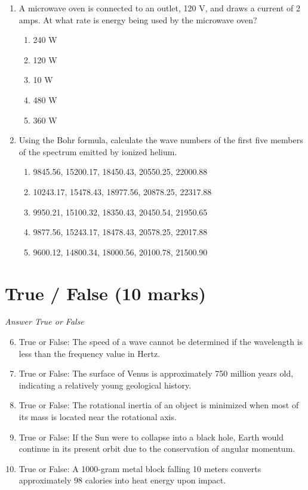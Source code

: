 \documentclass[12pt]{article}
\begin{document}
\begin{enumerate}[label=\arabic*.]
\item A microwave oven is connected to an outlet, 120 V, and draws a current of 2 amps. At what
rate is energy being used by the microwave oven?
\begin{enumerate}[label=(\alph*)]
    \item 240 W
    \item 120 W
    \item 10 W
    \item 480 W
    \item 360 W
\end{enumerate}
\item Using the Bohr formula, calculate the wave numbers of the first five members of the
spectrum emitted by ionized helium.
\begin{enumerate}[label=(\alph*)]
    \item 9845.56, 15200.17, 18450.43, 20550.25, 22000.88
    \item 10243.17, 15478.43, 18977.56, 20878.25, 22317.88
    \item 9950.21, 15100.32, 18350.43, 20450.54, 21950.65
    \item 9877.56, 15243.17, 18478.43, 20578.25, 22017.88
    \item 9600.12, 14800.34, 18000.56, 20100.78, 21500.90
\end{enumerate}
\end{enumerate}

\section*{True / False (10 marks)}
\textit{Answer True or False}
\begin{enumerate}[label=\arabic*.]
\setcounter{enumi}{5}
\item True or False: The speed of a wave cannot be determined if the wavelength is less than the frequency value in Hertz.
\item True or False: The surface of Venus is approximately 750 million years old, indicating a relatively young geological history.
\item True or False: The rotational inertia of an object is minimized when most of its mass is located near the rotational axis.
\item True or False: If the Sun were to collapse into a black hole, Earth would continue in its present orbit due to the conservation of angular momentum.
\item True or False: A 1000-gram metal block falling 10 meters converts approximately 98 calories into heat energy upon impact.
\end{enumerate}
\end{document}
